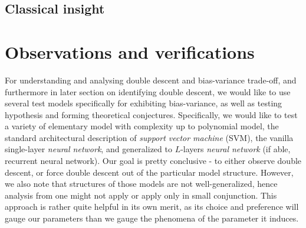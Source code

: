 \documentclass[10pt]{article}
\begin{document}
\subsection{Classical insight}

\clearpage

\section{Observations and verifications}

For understanding and analysing double descent and bias-variance trade-off, and furthermore in later section on identifying double descent, we would like to use several test models specifically for exhibiting bias-variance, as well as testing hypothesis and forming theoretical conjectures. Specifically, we would like to test a variety of elementary model with complexity up to polynomial model, the standard architectural description of \textit{support vector machine} (SVM), the vanilla single-layer \textit{neural network}, and generalized to $L$-layers \textit{neural network} (if able, recurrent neural network). Our goal is pretty conclusive - to either observe double descent, or force double descent out of the particular model structure. However, we also note that structures of those models are not well-generalized, hence analysis from one might not apply or apply only in small conjunction. This approach is rather quite helpful in its own merit, as its choice and preference will gauge our parameters than we gauge the phenomena of the parameter it induces. 
\end{document}
